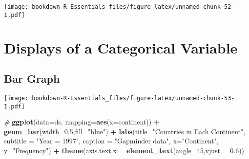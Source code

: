 \documentclass[]{book}
\newenvironment{Shaded}{\begin{snugshade}}{\end{snugshade}}
\newcommand{\KeywordTok}[1]{\textcolor[rgb]{0.13,0.29,0.53}{\textbf{#1}}}
\newcommand{\DataTypeTok}[1]{\textcolor[rgb]{0.13,0.29,0.53}{#1}}
\newcommand{\DecValTok}[1]{\textcolor[rgb]{0.00,0.00,0.81}{#1}}
\newcommand{\FloatTok}[1]{\textcolor[rgb]{0.00,0.00,0.81}{#1}}
\newcommand{\StringTok}[1]{\textcolor[rgb]{0.31,0.60,0.02}{#1}}
\newcommand{\CommentTok}[1]{\textcolor[rgb]{0.56,0.35,0.01}{\textit{#1}}}
\newcommand{\OperatorTok}[1]{\textcolor[rgb]{0.81,0.36,0.00}{\textbf{#1}}}
\newcommand{\NormalTok}[1]{#1}
\begin{document}
\texttt{[image: bookdown-R-Essentials\_files/figure-latex/unnamed-chunk-52-1.pdf]}

\section{Displays of a Categorical
Variable}\label{displays-of-a-categorical-variable}

\subsection{Bar Graph}\label{bar-graph}

\begin{Shaded}
\end{Shaded}

\texttt{[image: bookdown-R-Essentials\_files/figure-latex/unnamed-chunk-53-1.pdf]}

\begin{Shaded}
\begin{Highlighting}[]
\CommentTok{#}
\KeywordTok{ggplot}\NormalTok{(}\DataTypeTok{data=}\NormalTok{ds, }\DataTypeTok{mapping=}\KeywordTok{aes}\NormalTok{(}\DataTypeTok{x=}\NormalTok{continent)) }\OperatorTok{+}\StringTok{ }
\StringTok{  }\KeywordTok{geom_bar}\NormalTok{(}\DataTypeTok{width=}\FloatTok{0.5}\NormalTok{,}\DataTypeTok{fill=}\StringTok{"blue"}\NormalTok{) }\OperatorTok{+}
\StringTok{  }\KeywordTok{labs}\NormalTok{(}\DataTypeTok{title=}\StringTok{"Countries in Each Continent"}\NormalTok{,}
       \DataTypeTok{subtitle =} \StringTok{"Year = 1997"}\NormalTok{,}
       \DataTypeTok{caption =} \StringTok{"Gapminder data"}\NormalTok{,}
       \DataTypeTok{x=}\StringTok{"Continent"}\NormalTok{, }
       \DataTypeTok{y=}\StringTok{"Frequency"}\NormalTok{) }\OperatorTok{+}
\StringTok{  }\KeywordTok{theme}\NormalTok{(}\DataTypeTok{axis.text.x =} \KeywordTok{element_text}\NormalTok{(}\DataTypeTok{angle=}\DecValTok{45}\NormalTok{,}\DataTypeTok{vjust =} \FloatTok{0.6}\NormalTok{))}
\end{Highlighting}
\end{Shaded}
\end{document}
